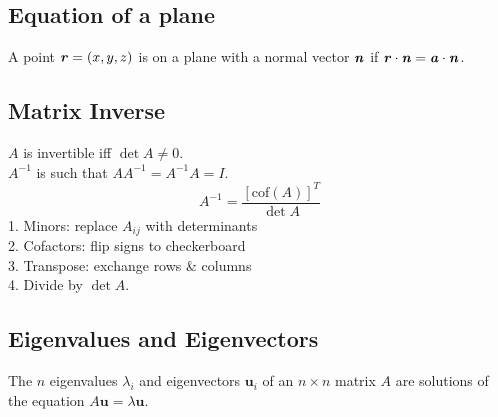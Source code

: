 \subsection*{Equation of a plane}
A point $\textbf{\textit{r}} = (x,y,z)$ is on a plane with a normal vector $\textbf{\textit{n}}$
if $\textbf{\textit{r}} \cdot \textbf{\textit{n}} = \textbf{\textit{a}} \cdot \textbf{\textit{n}}$.

\subsection*{Matrix Inverse}
$A$ is invertible iff $\det A \neq 0$. \\
$A^{-1}$ is such that $AA^{-1} = A^{-1}A = I$.
\begin{equation*}
  A^{-1} = \frac{[\mathrm{cof}(A)]^T}{\det A}
\end{equation*}
1. Minors: replace $A_{ij}$ with determinants\\
2. Cofactors: flip signs to checkerboard \\
3. Transpose: exchange rows \& columns \\
4. Divide by $\det A$.
\subsection*{Eigenvalues and Eigenvectors}

The $n$ eigenvalues $\lambda_i$ and eigenvectors $\mathbf{u}_i$ of 
an $n \times n$ matrix $A$ are solutions of the equation
$A\mathbf{u} = \lambda \mathbf{u}$.


